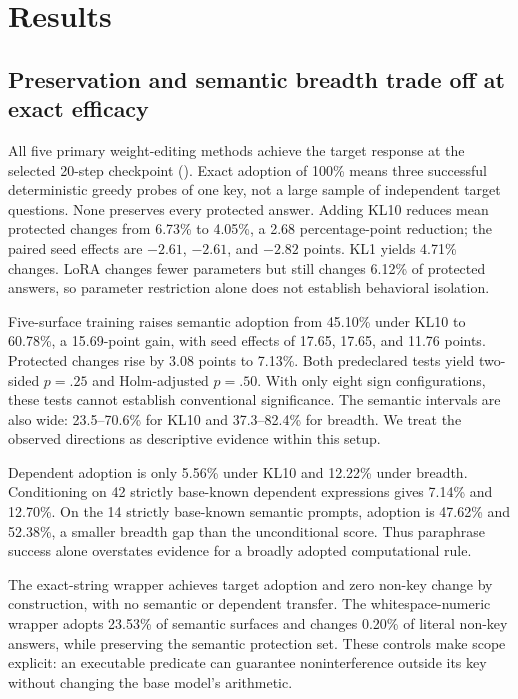 \section{Results}
\label{sec:results}
\subsection{Preservation and semantic breadth trade off at exact efficacy}

All five primary weight-editing methods achieve the target response at the selected 20-step checkpoint (). Exact adoption of 100\% means three successful deterministic greedy probes of one key, not a large sample of independent target questions. None preserves every protected answer. Adding KL10 reduces mean protected changes from 6.73\% to 4.05\%, a 2.68 percentage-point reduction; the paired seed effects are $-2.61$, $-2.61$, and $-2.82$ points. KL1 yields 4.71\% changes. LoRA changes fewer parameters but still changes 6.12\% of protected answers, so parameter restriction alone does not establish behavioral isolation.

Five-surface training raises semantic adoption from 45.10\% under KL10 to 60.78\%, a 15.69-point gain, with seed effects of 17.65, 17.65, and 11.76 points. Protected changes rise by 3.08 points to 7.13\%. Both predeclared tests yield two-sided $p=.25$ and Holm-adjusted $p=.50$. With only eight sign configurations, these tests cannot establish conventional significance. The semantic intervals are also wide: 23.5--70.6\% for KL10 and 37.3--82.4\% for breadth. We treat the observed directions as descriptive evidence within this setup.

 Dependent adoption is only 5.56\% under KL10 and 12.22\% under breadth. Conditioning on 42 strictly base-known dependent expressions gives 7.14\% and 12.70\%. On the 14 strictly base-known semantic prompts, adoption is 47.62\% and 52.38\%, a smaller breadth gap than the unconditional score. Thus paraphrase success alone overstates evidence for a broadly adopted computational rule.

 The exact-string wrapper achieves target adoption and zero non-key change by construction, with no semantic or dependent transfer. The whitespace-numeric wrapper adopts 23.53\% of semantic surfaces and changes 0.20\% of literal non-key answers, while preserving the semantic protection set. These controls make scope explicit: an executable predicate can guarantee noninterference outside its key without changing the base model's arithmetic.

